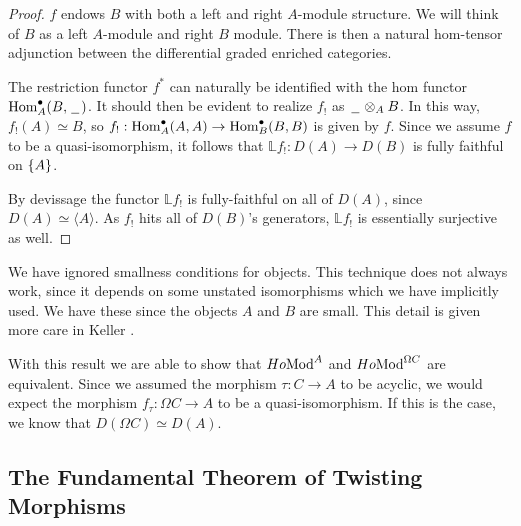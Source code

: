 \documentclass[../thesis.tex]{subfiles}
\begin{document}
            \begin{proof}
                $f$ endows $B$ with both a left and right $A$-module structure. We will think of $B$ as a left $A$-module and right $B$ module. There is then a natural hom-tensor adjunction between the differential graded enriched categories.

                \begin{center}
                \end{center}

                The restriction functor $f^*$ can naturally be identified with the hom functor $\tt{Hom}_A^\bullet(B,\argument)$. It should then be evident to realize $f_!$ as $\argument \otimes_A B$. In this way, $f_!(A) \simeq B$, so $f_! : \tt{Hom}_A^\bullet (A,A) \rightarrow \tt{Hom}_B^\bullet (B,B)$ is given by $f$. Since we assume $f$ to be a quasi-isomorphism, it follows that $\mathbb{L}f_! : D(A) \rightarrow D(B)$ is fully faithful on $\startset{A}$.

                By devissage the functor $\mathbb{L}f_!$ is fully-faithful on all of $D(A)$, since $D(A) \simeq \langle A \rangle$. As $f_!$ hits all of $D(B)$'s generators, $\mathbb{L}f_!$ is essentially surjective as well.
            \end{proof}

            \begin{remark}
                We have ignored smallness conditions for objects. This technique does not always work, since it depends on some unstated isomorphisms which we have implicitly used. We have these since the objects $A$ and $B$ are small. This detail is given more care in Keller \cite{Keller94}.
            \end{remark}
                
            With this result we are able to show that $Ho \tt{Mod}^A$ and $Ho \tt{Mod}^{\Omega C}$ are equivalent. Since we assumed the morphism $\tau: C \rightarrow A$ to be acyclic, we would expect the morphism $f_\tau : \Omega C \rightarrow A$ to be a quasi-isomorphism. If this is the case, we know that $D(\Omega C)\simeq D(A)$. 

        \subsection{The Fundamental Theorem of Twisting Morphisms}
\end{document}
